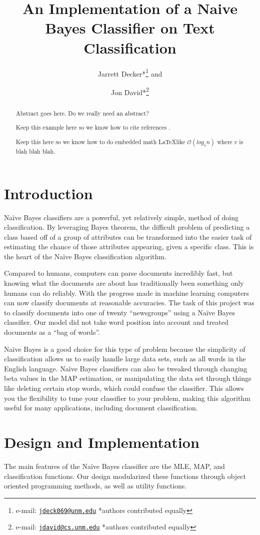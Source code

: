 \documentclass{IEEEtran}
\author{Jarrett Decker*\thanks{e-mail:
    \href{mailto:jdeck069@unm.edu}
         {\texttt{jdeck069@unm.edu}}
         {*authors contributed equally}} and
\and
       Jon David*\thanks{e-mail:
    \href{mailto:jdavid@cs.unm.edu}
         {\texttt{jdavid@cs.unm.edu}}
         {*authors contributed equally}}}
\title{An Implementation of a Naive Bayes Classifier on Text Classification}
\begin{document}
\maketitle

\begin{abstract}

Abstract goes here. Do we really need an abstract?

Keep this example here so we know how to cite references \parencite{mitchell1997machine}.

Keep this here so we know how to do embedded math \LaTeX like $\mathcal{O}(log_{v}n)$
where $v$ is blah blah blah.
\end{abstract}


\section{Introduction}
Naïve Bayes classifiers are a powerful, yet relatively simple, method of doing classification. By leveraging Bayes theorem, the difficult problem of predicting a class based off of a group of attributes can be transformed into the easier task of estimating the chance of those attributes appearing, given a specific class. This is the heart of the Naïve Bayes classification algorithm.

Compared to humans, computers can parse documents incredibly fast, but knowing what the documents are about has traditionally been something only humans can do reliably. With the progress made in machine learning computers can now classify documents at reasonable accuracies. The task of this project was to classify documents into one of twenty “newsgroups” using a Naïve Bayes classifier. Our model did not take word position into account and treated documents as a “bag of words”. 

Naïve Bayes is a good choice for this type of problem because the simplicity of classification allows us to easily handle large data sets, such as all words in the English language.  Naïve Bayes classifiers can also be tweaked through changing beta values in the MAP estimation, or manipulating the data set through things like deleting certain stop words, which could confuse the classifier. This allows you the flexibility to tune your classifier to your problem, making this algorithm useful for many applications, including document classification.

\section{Design and Implementation}
The main features of the Naïve Bayes classifier are the MLE, MAP, and classification functions. Our design modularized these functions through object oriented programming methods, as well as utility functions. 
\end{document}
